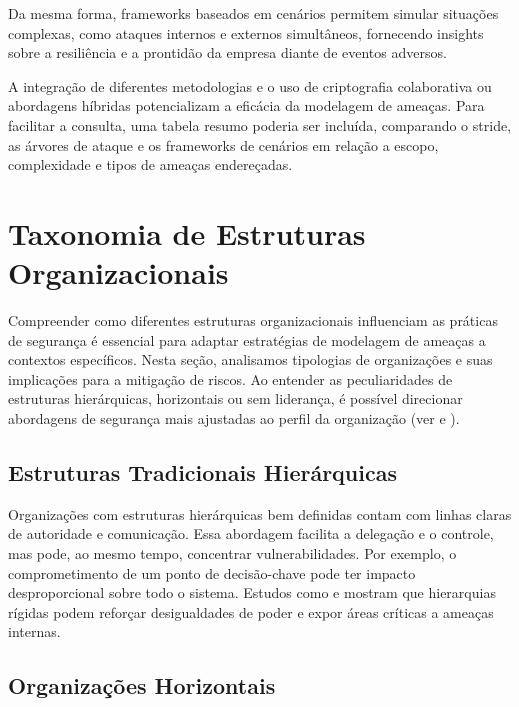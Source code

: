 Da mesma forma, frameworks baseados em cenários permitem
simular situações complexas, como ataques internos e
externos simultâneos, fornecendo insights sobre a
resiliência e a prontidão da empresa diante de eventos
adversos.

A integração de diferentes metodologias e o uso de
criptografia colaborativa \cite{AbcCrypto} ou abordagens
híbridas \cite{CoReTM} potencializam a eficácia da modelagem
de ameaças. Para facilitar a consulta, uma tabela resumo
poderia ser incluída, comparando o \gls{stride}, as árvores
de ataque e os frameworks de cenários em relação a escopo,
complexidade e tipos de ameaças endereçadas.

\section{Taxonomia de Estruturas Organizacionais}
\label{sec:taxonomia_de_estruturas_organizacionais}

Compreender como diferentes estruturas organizacionais
influenciam as práticas de segurança é essencial para
adaptar estratégias de modelagem de ameaças a contextos
específicos. Nesta seção, analisamos tipologias de
organizações e suas implicações para a mitigação de riscos.
Ao entender as peculiaridades de estruturas hierárquicas,
horizontais ou sem liderança, é possível direcionar
abordagens de segurança mais ajustadas ao perfil da
organização (ver \cite{WorkerCooperativesinAmerica} e
\cite{RealNotNominalGlobalDemocracy}).

\subsection{Estruturas Tradicionais Hierárquicas}
\label{sec:estruturas_tradicionais_hierarquicas}

Organizações com estruturas hierárquicas bem definidas
contam com linhas claras de autoridade e comunicação. Essa
abordagem facilita a delegação e o controle, mas pode, ao
mesmo tempo, concentrar vulnerabilidades. Por exemplo, o
comprometimento de um ponto de decisão-chave pode ter
impacto desproporcional sobre todo o sistema. Estudos como
\cite{ThreatModelingASystematicLiteratureReview} e
\cite{DoArtifactsHavePolitics} mostram que hierarquias
rígidas podem reforçar desigualdades de poder e expor áreas
críticas a ameaças internas.

\subsection{Organizações Horizontais}
\label{sec:organizacoes_horizontais}

